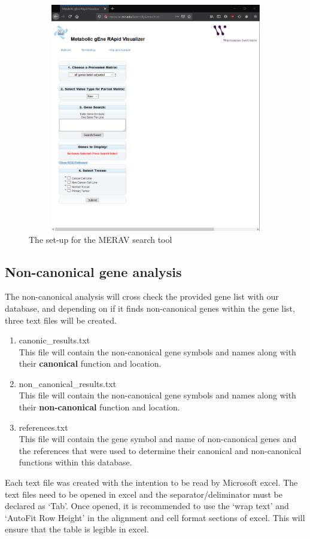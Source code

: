 \documentclass[11pt]{article}
\begin{document}
\begin{figure}[h!]
\centering
\includegraphics[width=15cm,height=10cm,keepaspectratio]{MERAV.png}
\caption{The set-up for the MERAV search tool}
\label{fig:merav}
\end{figure}

\subsection{Non-canonical gene analysis}
The non-canonical analysis will cross check the provided gene list with our database, and depending on if it finds non-canonical genes within the gene list, three text files will be created.
\begin{enumerate}
\item canonic\_results.txt\\
This file will contain the non-canonical gene symbols and names along with their \textbf{canonical} function and location.
\item non\_canonical\_results.txt\\
This file will contain the non-canonical gene symbols and names along with their \textbf{non-canonical} function and location.
\item references.txt\\
This file will contain the gene symbol and name of non-canonical genes and the references that were used to determine their canonical and non-canonical functions within this database.
\end{enumerate}
Each text file was created with the intention to be read by Microsoft excel. The text files need to be opened in excel and the separator/deliminator must be declared as `Tab'. Once opened, it is recommended to use the `wrap text' and `AutoFit Row Height' in the alignment and cell format sections of excel. This will ensure that the table is legible in excel.
\newpage
\end{document}
